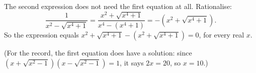 The second expression does not need the first equation at all. Rationalise:
\[
\dfrac{1}{x^2-\sqrt{x^4+1}}=\dfrac{x^2+\sqrt{x^4+1}}{x^4-(x^4+1)}=-\left(x^2+\sqrt{x^4+1}\right).
\]
So the expression equals $x^2+\sqrt{x^4+1}-\left(x^2+\sqrt{x^4+1}\right)=\boxed{0}$, for every real $x$.

(For the record, the first equation does have a solution: since $\left(x+\sqrt{x^2-1}\right)\left(x-\sqrt{x^2-1}\right)=1$, it says $2x=20$, so $x=10$.)
